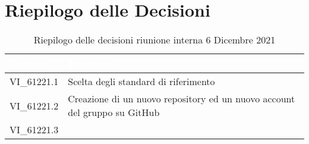 \section{Riepilogo delle Decisioni}


\begin{table}[!htbp]
\renewcommand{\arraystretch}{1.5}
\begin{tabular}{m{}<{\centering}  m{}<{\centering}}
\rowcolor{darkblue} \textcolor{white}{\textbf{Codice}} & \textcolor{white}{\textbf{Decisione}} \\
\hline
VI\_61221.1 & Scelta degli standard di riferimento \\
\rowcolor{gray!10} VI\_61221.2 & Creazione di un nuovo repository ed un nuovo account del gruppo su GitHub \\
VI\_61221.3 & \\
\end{tabular}
\caption{Riepilogo delle decisioni riunione interna 6 Dicembre 2021}
\end{table}